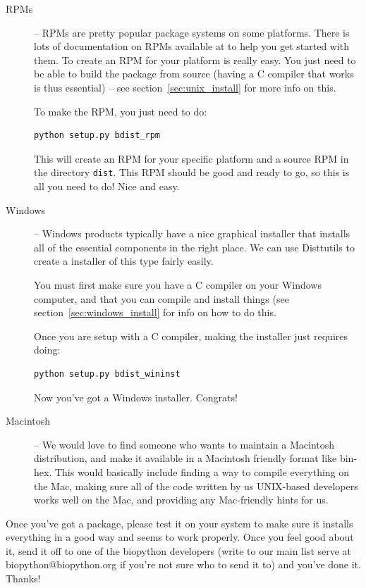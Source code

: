 \documentclass{report}
\begin{document}
\begin{description}
  \item[RPMs] -- RPMs are pretty popular package systems on some platforms. There is lots of documentation on RPMs available at  to help you get started with them. To create an RPM for your platform is really easy. You just need to be able to build the package from source (having a C compiler that works is thus essential) -- see section~\ref{sec:unix_install} for more info on this.


To make the RPM, you just need to do:

\begin{verbatim}
python setup.py bdist_rpm
\end{verbatim}

This will create an RPM for your specific platform and a source RPM in the directory \verb|dist|. This RPM should be good and ready to go, so this is all you need to do! Nice and easy.

\item[Windows] -- Windows products typically have a nice graphical installer that installs all of the essential components in the right place. We can use Disttutils to create a installer of this type fairly easily.


You must first make sure you have a C compiler on your Windows computer, and that you can compile and install things (see section~\ref{sec:windows_install} for info on how to do this.


Once you are setup with a C compiler, making the installer just requires doing:

\begin{verbatim}
python setup.py bdist_wininst
\end{verbatim}

Now you've got a Windows installer. Congrats!

\item[Macintosh] -- We would love to find someone who wants to maintain a Macintosh distribution, and make it available in a Macintosh friendly format like bin-hex. This would basically include finding a way to compile everything on the Mac, making sure all of the code written by us UNIX-based developers works well on the Mac, and providing any Mac-friendly hints for us.

\end{description}

Once you've got a package, please test it on your system to make sure it installs everything in a good way and seems to work properly. Once you feel good about it, send it off to one of the biopython developers (write to our main list serve at biopython@biopython.org if you're not sure who to send it to) and you've done it. Thanks!
\end{document}
